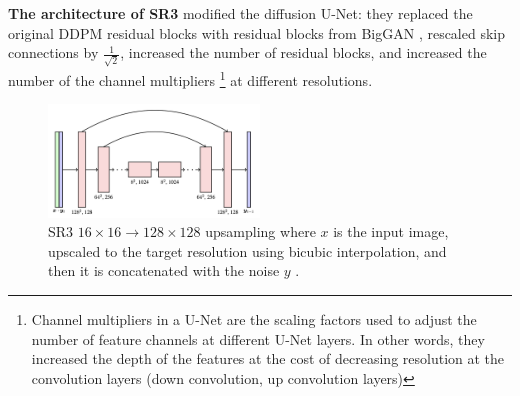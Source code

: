 \textbf{The architecture of SR3} modified the diffusion U-Net: they replaced the original DDPM residual blocks with residual blocks from BigGAN \cite{biggan_deep}, rescaled skip connections by $\frac{1}{\sqrt{2}}$, increased the number of residual blocks, and increased the number of the channel multipliers \footnote{Channel multipliers in a U-Net are the scaling factors used to adjust the number of feature channels at different U-Net layers. In other words, they increased the depth of the features at the cost of decreasing resolution at the convolution layers (down convolution, up convolution layers)} at different resolutions.



\begin{figure}
    \centering
    \includegraphics[width=0.5\textwidth]{images/imagen/sr3_architecture.png}
    \caption{SR3 $16\times 16 \rightarrow 128\times 128$ upsampling where $x$ is the input image, upscaled to the target resolution using bicubic interpolation, and then it is concatenated with the noise $y$ \cite{sr3}.}
    \label{fig:sr3_architecture}
\end{figure}















